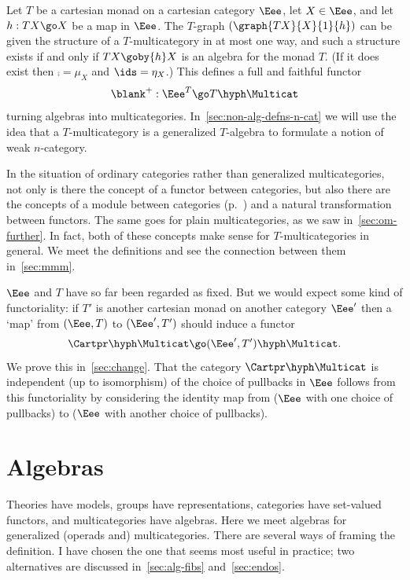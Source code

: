 \begin{example}	
Let $T$ be a cartesian monad on a cartesian category $\Eee$, let
$X\in\Eee$, and let $h: TX \go X$ be a map in $\Eee$.  The $T$-graph
$(\graph{TX}{X}{1}{h})$ can be given the structure of a $T$-multicategory
in at most one way, and such a structure exists if and only if $TX \goby{h}
X$ is an algebra for the monad $T$.  (If it does exist then $\comp=\mu_X$
and $\ids=\eta_X$.)  This defines a full and faithful functor
\[
\blank^{+}: \Eee^T \go T\hyph\Multicat
\]%
% 
%
%
%
%
%
% 
turning algebras into multicategories.  In~\ref{sec:non-alg-defns-n-cat} we
will use the idea that a $T$-multicategory is a generalized $T$-algebra to
formulate a notion of weak $n$-category.
\end{example}


In the situation of ordinary categories rather than generalized
multicategories, not only is there the concept of a functor between
categories, but also there are the concepts of a module between categories
(p.~\pageref{p:defn-cat-module}) and a natural transformation between
functors.  The same goes for plain multicategories, as we saw
in~\ref{sec:om-further}.  In fact, both of these concepts make sense for
$T$-multicategories in general.  We meet the definitions and see the
connection between them in~\ref{sec:mmm}.

$\Eee$ and $T$ have so far been regarded as fixed.  But we would
expect some kind of functoriality:%
%
%
if $T'$ is another cartesian monad on another category $\Eee'$ then a `map'
from $(\Eee,T)$ to $(\Eee',T')$ should induce a functor
\[
\Cartpr\hyph\Multicat \go
(\Eee', T')\hyph\Multicat. 
\]
We prove this in~\ref{sec:change}.  That the category
$\Cartpr\hyph\Multicat$ is independent (up to isomorphism) of the choice%
%
%
of
pullbacks in $\Eee$ follows from this functoriality by considering the
identity map from ($\Eee$ with one choice of pullbacks) to ($\Eee$ with
another choice of pullbacks).


\section{Algebras}

Theories have models, groups have representations, categories have
set-valued functors, and multicategories have algebras.  Here we meet
algebras for generalized (operads and) multicategories.  There are several
ways of framing the definition.  I have chosen the one that seems most
useful in practice; two alternatives are discussed in~\ref{sec:alg-fibs}
and~\ref{sec:endos}.

